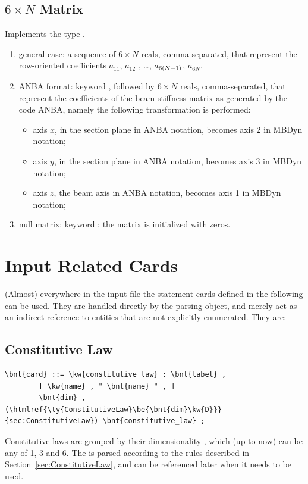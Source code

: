 \subsection{$6 \times N$ Matrix}
\label{sec:Mat6xN}
Implements the type .
\begin{enumerate}
    \item general case: a sequence of $6 \times N$ reals, comma-separated, that
    represent the row-oriented coefficients $ a_{11} $, $ a_{12}$ ,
    \ldots, $ a_{6\left( N-1 \right)} $, $ a_{6N} $.
    \item ANBA format: keyword , followed by $6 \times N$ reals,
    comma-separated, that represent the coefficients of the beam stiffness
    matrix as generated by the code ANBA, namely the following
    transformation is performed:
    \begin{itemize}
        \item axis $ x $, in the section plane in ANBA notation, 
	becomes axis 2 in MBDyn notation;    
	\item axis $ y $, in the section plane in ANBA notation, 
	becomes axis 3 in MBDyn notation;    
	\item axis $ z $, the beam axis in ANBA notation, 
	becomes axis 1 in MBDyn notation;    
    \end{itemize}
    \item null matrix: keyword ; the matrix is initialized 
    with zeros.
\end{enumerate}


\section{Input Related Cards} 
(Almost) everywhere in the input file the statement cards defined 
in the following can be used.
They are handled directly by the parsing object, and merely act as
an indirect reference to entities that are not explicitly enumerated.
They are:



\subsection{Constitutive Law}\label{sec:CONSTITUTIVE-LAW}
\begin{Verbatim}[commandchars=\\\{\}]
    \bnt{card} ::= \kw{constitutive law} : \bnt{label} ,
        [ \kw{name} , " \bnt{name} " , ]
        \bnt{dim} , (\htmlref{\ty{ConstitutiveLaw}\be{\bnt{dim}\kw{D}}}{sec:ConstitutiveLaw}) \bnt{constitutive_law} ;
\end{Verbatim}
Constitutive laws are grouped by their dimensionality ,
which (up to now) can be any of 1, 3 and 6.
The  is parsed according to the rules
described in Section~\ref{sec:ConstitutiveLaw},
and can be referenced later when it needs to be used.



